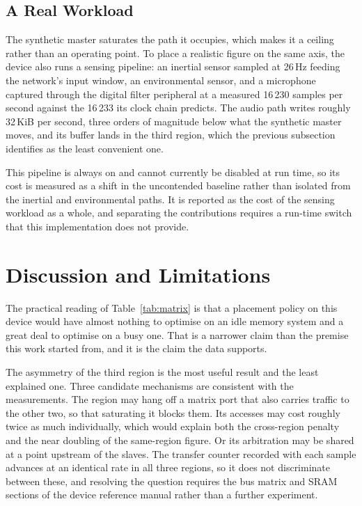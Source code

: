 \documentclass[conference]{IEEEtran}
\begin{document}
\subsection{A Real Workload}

The synthetic master saturates the path it occupies, which makes it a
ceiling rather than an operating point. To place a realistic figure on
the same axis, the device also runs a sensing pipeline: an inertial
sensor sampled at 26\,Hz feeding the network's input window, an
environmental sensor, and a microphone captured through the digital
filter peripheral at a measured 16\,230 samples per second against the
16\,233 its clock chain predicts. The audio path writes roughly 32\,KiB
per second, three orders of magnitude below what the synthetic master
moves, and its buffer lands in the third region, which the previous
subsection identifies as the least convenient one.

This pipeline is always on and cannot currently be disabled at run time,
so its cost is measured as a shift in the uncontended baseline rather
than isolated from the inertial and environmental paths. It is reported
as the cost of the sensing workload as a whole, and separating the
contributions requires a run-time switch that this implementation does
not provide.

\section{Discussion and Limitations}

The practical reading of Table~\ref{tab:matrix} is that a placement
policy on this device would have almost nothing to optimise on an idle
memory system and a great deal to optimise on a busy one. That is a
narrower claim than the premise this work started from, and it is the
claim the data supports.

The asymmetry of the third region is the most useful result and the least
explained one. Three candidate mechanisms are consistent with the
measurements. The region may hang off a matrix port that also carries
traffic to the other two, so that saturating it blocks them. Its accesses
may cost roughly twice as much individually, which would explain both the
cross-region penalty and the near doubling of the same-region figure.
Or its arbitration may be shared at a point upstream of the slaves. The
transfer counter recorded with each sample advances at an identical rate
in all three regions, so it does not discriminate between these, and
resolving the question requires the bus matrix and SRAM sections of the
device reference manual rather than a further experiment.
\end{document}
